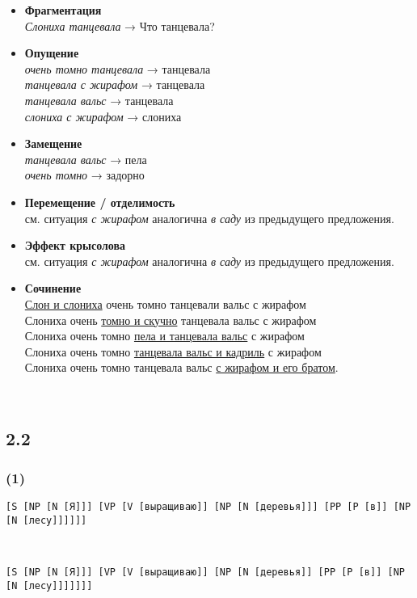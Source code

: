 \documentclass[14pt,extrafontsizes]{article}
\begin{document}
\begin{itemize}
    \item \textbf{Фрагментация}\\
    \textit{Слониха танцевала} → Что танцевала?\\
    \item \textbf{Опущение}\\
    \textit{очень томно танцевала} → танцевала\\
    \textit{танцевала с жирафом} → танцевала\\
    \textit{танцевала вальс} → танцевала\\
    \textit{слониха с жирафом} → слониха
    \item \textbf{Замещение}\\
    \textit{танцевала вальс} → пела\\
    \textit{очень томно} → задорно 
    \item \textbf{Перемещение / отделимость}\\
    см. ситуация \textit{с жирафом} аналогична \textit{в саду} из предыдущего предложения.
    \item \textbf{Эффект крысолова}\\
    см. ситуация \textit{с жирафом} аналогична \textit{в саду} из предыдущего предложения.
    \item \textbf{Сочинение}\\
    \underline{Слон и слониха} очень томно танцевали вальс с жирафом\\
    Слониха очень \underline{томно и скучно} танцевала вальс с жирафом\\
    Слониха очень томно \underline{пела и танцевала вальс} с жирафом\\
    Слониха очень томно \underline{танцевала вальс и кадриль} с жирафом\\
    Слониха очень томно танцевала вальс \underline{с жирафом и его братом}.
\end{itemize}
\\
\subsection*{2.2}
\subsubsection*{(1)}
\begin{verbatim}
[S [NP [N [Я]]] [VP [V [выращиваю]] [NP [N [деревья]]] [PP [P [в]] [NP [N [лесу]]]]]]
\end{verbatim}
\\
\begin{verbatim}
[S [NP [N [Я]]] [VP [V [выращиваю]] [NP [N [деревья]] [PP [P [в]] [NP [N [лесу]]]]]]]
\end{verbatim}
\\
\end{document}

